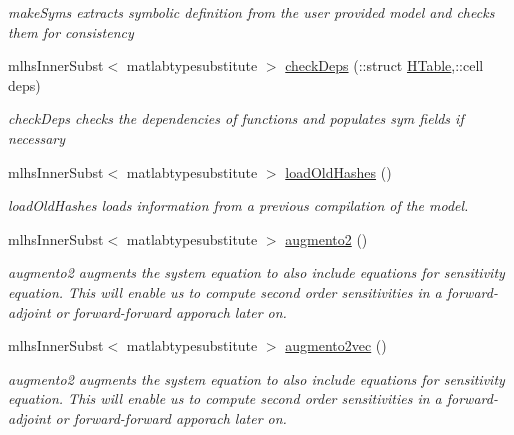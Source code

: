 \begin{DoxyCompactItemize}
\begin{DoxyCompactList}\small\item\em make\+Syms extracts symbolic definition from the user provided model and checks them for consistency \end{DoxyCompactList}\item 
mlhs\+Inner\+Subst$<$ matlabtypesubstitute $>$ \hyperlink{classamimodel_ad8b3b7be2def1fea709aaa6f02f04137}{check\+Deps} (\+::struct \hyperlink{classamimodel_aafe6335df413dd688a2f44efba012cf1}{H\+Table},\+::cell deps)
\begin{DoxyCompactList}\small\item\em check\+Deps checks the dependencies of functions and populates sym fields if necessary \end{DoxyCompactList}\item 
mlhs\+Inner\+Subst$<$ matlabtypesubstitute $>$ \hyperlink{classamimodel_a93346c96338624e417ee9732ffd96b28}{load\+Old\+Hashes} ()
\begin{DoxyCompactList}\small\item\em load\+Old\+Hashes loads information from a previous compilation of the model. \end{DoxyCompactList}\item 
mlhs\+Inner\+Subst$<$ matlabtypesubstitute $>$ \hyperlink{classamimodel_abddb278082c1ff018f3b0ef121bba51a}{augmento2} ()
\begin{DoxyCompactList}\small\item\em augmento2 augments the system equation to also include equations for sensitivity equation. This will enable us to compute second order sensitivities in a forward-\/adjoint or forward-\/forward apporach later on. \end{DoxyCompactList}\item 
mlhs\+Inner\+Subst$<$ matlabtypesubstitute $>$ \hyperlink{classamimodel_aaed774df1b9efcebe493ae9f499bb8cf}{augmento2vec} ()
\begin{DoxyCompactList}\small\item\em augmento2 augments the system equation to also include equations for sensitivity equation. This will enable us to compute second order sensitivities in a forward-\/adjoint or forward-\/forward apporach later on. \end{DoxyCompactList}\end{DoxyCompactItemize}
